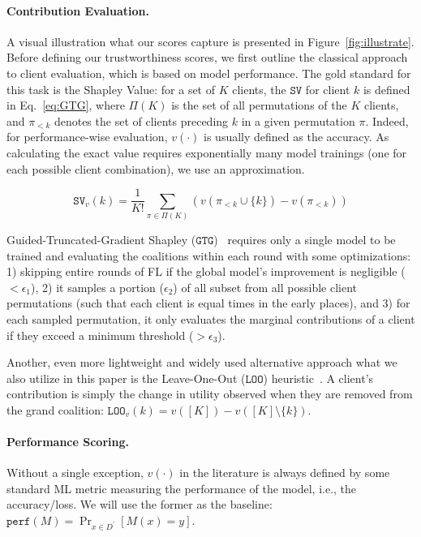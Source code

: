 \documentclass[sigconf]{acmart}
\begin{document}
\paragraph{Contribution Evaluation. }

A visual illustration what our scores capture is presented in Figure~\ref{fig:illustrate}. Before defining our trustworthiness scores, we first outline the classical approach to client evaluation, which is based on model performance. The gold standard for this task is the Shapley Value: for a set of $K$ clients, the $\mathtt{SV}$ for client $k$ is defined in Eq.~\eqref{eq:GTG}, where $\Pi(K)$ is the set of all permutations of the $K$ clients, and $\pi_{<k}$ denotes the set of clients preceding $k$ in a given permutation $\pi$. Indeed, for performance-wise evaluation, $v(\cdot)$ is usually defined as the accuracy. As calculating the exact value requires exponentially many model trainings (one for each possible client combination), we use an approximation. 

\begin{equation}
    \label{eq:GTG}
    \mathtt{SV}_v(k) = \frac{1}{K!} \sum_{\pi \in \Pi(K)} \left( v(\pi_{<k} \cup \{k\}) - v(\pi_{<k}) \right)
\end{equation}

Guided-Truncated-Gradient Shapley ($\mathtt{GTG}$)~\cite{liu2022gtg} requires only a single model to be trained and evaluating the coalitions within each round with some optimizations: 1) skipping entire rounds of FL if the global model's improvement is negligible ($<\epsilon_1$), 2) it samples a portion ($\epsilon_2$) of all subset from all possible client permutations (such that each client is equal times in the early places), and 3) for each sampled permutation, it only evaluates the marginal contributions of a client if they exceed a minimum threshold ($>\epsilon_3$). 

Another, even more lightweight and widely used alternative approach what we also utilize in this paper is the Leave-One-Out ($\mathtt{LOO}$) heuristic~\cite{evgeniou2004leave}. A client's contribution is simply the change in utility observed when they are removed from the grand coalition: $\mathtt{LOO}_v(k) = v([K]) - v([K]\setminus\{k\})$.

\paragraph{Performance Scoring. }

Without a single exception, $v(\cdot)$ in the literature is always defined by some standard ML metric measuring the performance of the model, i.e., the accuracy/loss. We will use the former as the baseline: $ \mathtt{perf}(M)=\Pr_{x\in D^\prime}[M(x) = y]$. 
\end{document}
